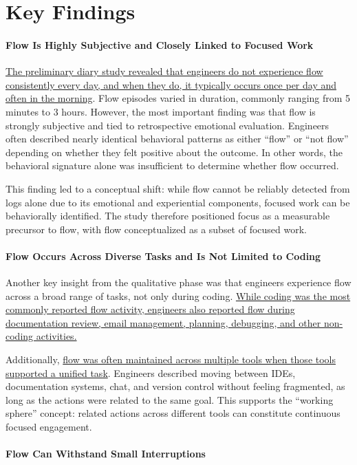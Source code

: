 \section{Key Findings}

\paragraph{Flow Is Highly Subjective and Closely Linked to Focused Work}
\uline{The preliminary diary study revealed that engineers do not experience flow consistently every day, and when they do, it typically occurs once per day and often in the morning}. Flow episodes varied in duration, commonly ranging from 5 minutes to 3 hours. However, the most important finding was that flow is strongly subjective and tied to retrospective emotional evaluation. Engineers often described nearly identical behavioral patterns as either “flow” or “not flow” depending on whether they felt positive about the outcome. In other words, the behavioral signature alone was insufficient to determine whether flow occurred.

This finding led to a conceptual shift: while flow cannot be reliably detected from logs alone due to its emotional and experiential components, focused work can be behaviorally identified. The study therefore positioned focus as a measurable precursor to flow, with flow conceptualized as a subset of focused work.

\paragraph{Flow Occurs Across Diverse Tasks and Is Not Limited to Coding}
Another key insight from the qualitative phase was that engineers experience flow across a broad range of tasks, not only during coding. \uline{While coding was the most commonly reported flow activity, engineers also reported flow during documentation review, email management, planning, debugging, and other non-coding activities.}

Additionally, \uline{flow was often maintained across multiple tools when those tools supported a unified task}. Engineers described moving between IDEs, documentation systems, chat, and version control without feeling fragmented, as long as the actions were related to the same goal. This supports the “working sphere” concept: related actions across different tools can constitute continuous focused engagement.

\paragraph{Flow Can Withstand Small Interruptions}

